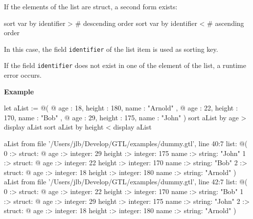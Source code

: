 \documentclass[10pt,openright,twosides,final]{memoir}
\newcommand{\gtltype}[1]{{\small\ttfamily #1}}
\newcommand{\gtlinline}[1]{\colorbox{light-blue}{\lstinline[language=gtl]{#1}}}
\newcommand{\example}{\vspace{.75em}\noindent\textbf{Example}\vspace{0em}}
\begin{document}
If the elements of the list are \gtltype{struct}, a second form exists:

\begin{gtl}
sort var by identifier > # descending order
sort var by identifier < # ascending order
\end{gtl}

In this case, the field \gtlinline{identifier} of the list item is used as sorting key.

If the field \gtlinline{identifier} does not exist in one of the element of the list, a runtime error occurs.

\example
\begin{gtl}
let aList := @(
  @{ age : 18, height : 180, name : "Arnold" },
  @{ age : 22, height : 170, name : "Bob"    },
  @{ age : 29, height : 175, name : "John"   }
)
sort aList by age >
display aList
sort aList by height <
display aList
\end{gtl}
\begin{console}
aList from file '/Users/jlb/Develop/GTL/examples/dummy.gtl', line 40:7
    list: @(
        0 :>
            struct: @{
                age :>
                    integer: 29
                height :>
                    integer: 175
                name :>
                    string: "John"
            }
        1 :>
            struct: @{
                age :>
                    integer: 22
                height :>
                    integer: 170
                name :>
                    string: "Bob"
            }
        2 :>
            struct: @{
                age :>
                    integer: 18
                height :>
                    integer: 180
                name :>
                    string: "Arnold"
            }
    )
aList from file '/Users/jlb/Develop/GTL/examples/dummy.gtl', line 42:7
    list: @(
        0 :>
            struct: @{
                age :>
                    integer: 22
                height :>
                    integer: 170
                name :>
                    string: "Bob"
            }
        1 :>
            struct: @{
                age :>
                    integer: 29
                height :>
                    integer: 175
                name :>
                    string: "John"
            }
        2 :>
            struct: @{
                age :>
                    integer: 18
                height :>
                    integer: 180
                name :>
                    string: "Arnold"
            }
    )
\end{console}
\end{document}
